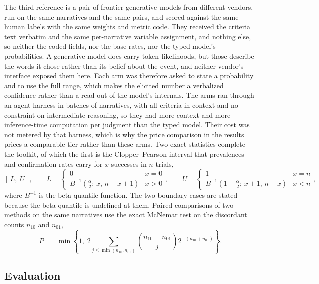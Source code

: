 The third reference is a pair of frontier generative models from different vendors, run on the
same \FrontierNarratives{} narratives and the same \CoderNPairs{} pairs, and scored against the
same human labels with the same weights and metric code. They received the criteria text
verbatim and the same per-narrative variable assignment, and nothing else, so neither the coded
fields, nor the base rates, nor the typed model's probabilities. A generative model does carry
token likelihoods, but those describe the words it chose rather than its belief about the event,
and neither vendor's interface exposed them here. Each arm was therefore asked to state a
probability and to use the full range, which makes the elicited number a verbalized confidence
rather than a read-out of the model's internals. The arms ran through an agent harness in
\FrontierBatches{} batches of \FrontierBatchSize{} narratives, with all criteria in context and
no constraint on intermediate reasoning, so they had more context and more inference-time
computation per judgment than the typed model. Their cost was not metered by that harness, which
is why the price comparison in the results prices a comparable tier rather than these arms. Two
exact statistics complete the toolkit, of which the first is the Clopper--Pearson interval
that prevalences and confirmation rates carry for $x$ successes in $n$ trials,
\begin{equation}
\left[\,L,\; U\right], \qquad
L = \begin{cases} 0 & x = 0\\ B^{-1}\!\left(\tfrac{\alpha}{2};\, x,\, n - x + 1\right) & x > 0\end{cases},
\qquad
U = \begin{cases} 1 & x = n\\ B^{-1}\!\left(1 - \tfrac{\alpha}{2};\, x + 1,\, n - x\right) & x < n\end{cases},
\label{eq:cp}
\end{equation}
where $B^{-1}$ is the beta quantile function. The two boundary cases are stated because the
beta quantile is undefined at them. Paired comparisons of two methods on the
same narratives use the exact McNemar test on the discordant counts $n_{10}$ and $n_{01}$,
\begin{equation}
P \;=\; \min\!\left\{1,\; 2\sum_{j \le \min(n_{10}, n_{01})} \binom{n_{10}+n_{01}}{j} 2^{-(n_{10}+n_{01})}\right\}.
\label{eq:mcnemar}
\end{equation}


\subsection{Evaluation}
\label{sec:evaluation}


